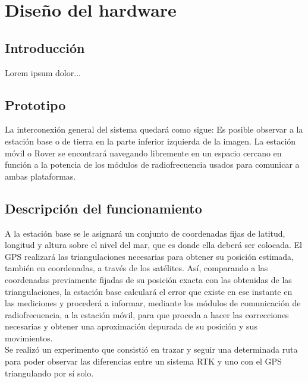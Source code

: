 
\chapter{Diseño del hardware}
\label{Chap:DisHard} %


\section{Introducción}

Lorem ipsum dolor...

\section{Prototipo}

La interconexión general del sistema quedará como sigue: Es posible observar a la estación base o de tierra en la parte inferior izquierda de la imagen. La estación móvil o Rover se encontrará navegando libremente en un espacio cercano en función a la potencia de los módulos de radiofrecuencia usados para comunicar a ambas plataformas.

\section{Descripción del funcionamiento}

A la estación base se le asignará un conjunto de coordenadas fijas de latitud, longitud y altura sobre el nivel del mar, que es donde ella deberá ser colocada. El GPS realizará las triangulaciones necesarias para obtener su posición estimada, también en coordenadas, a través de los satélites. Así, comparando a las coordenadas previamente fijadas de su posición exacta con las obtenidas de las triangulaciones, la estación base calculará el
error que existe en ese instante en las mediciones y procederá a informar, mediante los módulos de comunicación de radiofrecuencia, a la estación móvil, para que proceda a hacer las correcciones necesarias y obtener una aproximación depurada de su posición y sus movimientos. \\

Se realizó un experimento que consistió en trazar y seguir una determinada ruta para poder observar las diferencias entre un sistema RTK y uno con el GPS triangulando por sí solo. \\

